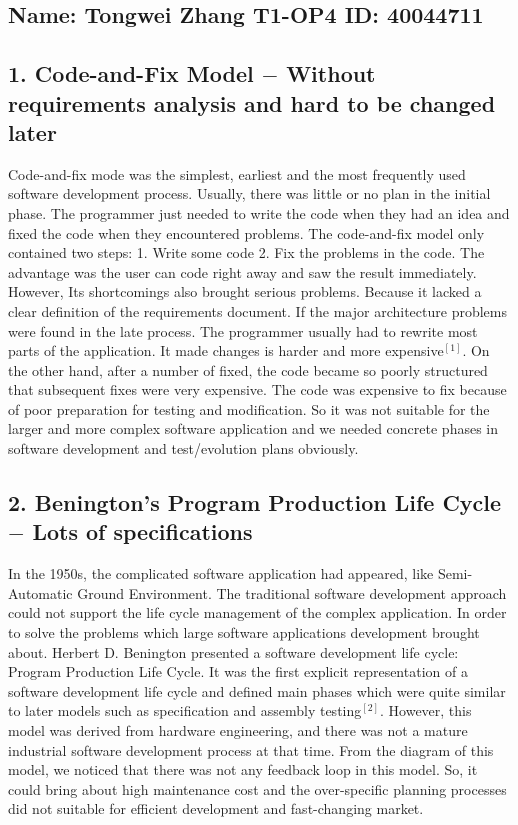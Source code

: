 \documentclass[11pt]{report}
\begin{document}
\subsection*{Name: Tongwei Zhang\hspace{2cm} T1-OP4 \hspace{2cm}ID: 40044711 }
\subsection*{1. Code-and-Fix Model $-$ Without requirements analysis and hard to be changed later}
Code-and-fix mode was the simplest, earliest and the most frequently used software development process. Usually, there was little or no plan in the initial phase. The programmer just needed to write the code when they had an idea and fixed the code when they encountered problems. The code-and-fix model only contained two steps: 1. Write some code 2. Fix the problems in the code. The advantage was the user can code right away and saw the result immediately. However, Its shortcomings also brought serious problems. Because it lacked a clear definition of the requirements document. If the major architecture problems were found in the late process. The programmer usually had to rewrite most parts of the application. It made changes is harder and more expensive$^{[1]}$. On the other hand, after a number of fixed, the code became so poorly structured that subsequent fixes were very expensive. The code was expensive to fix because of poor preparation for testing and modification. So it was not suitable for the larger and more complex software application and we needed concrete phases in software development and test/evolution plans obviously.
\vspace{-0.3cm}
\subsection*{2. Benington's Program Production Life Cycle $-$ Lots of specifications}
In the 1950s, the complicated software application had appeared, like Semi-Automatic Ground Environment. The traditional software development approach could not support the life cycle management of the complex application. In order to solve the problems which large software applications development brought about. Herbert D. Benington presented a software development life cycle: Program Production Life Cycle. It was the first explicit representation of a software development life cycle and defined main phases which were quite similar to later models such as specification and assembly testing$^{[2]}$. However, this model was derived from hardware engineering, and there was not a mature industrial software development process at that time. From the diagram of this model, we noticed that there was not any feedback loop in this model. So, it could bring about high maintenance cost and the over-specific planning processes did not suitable for efficient development and fast-changing market.
\vspace{-0.2cm}
\end{document}
